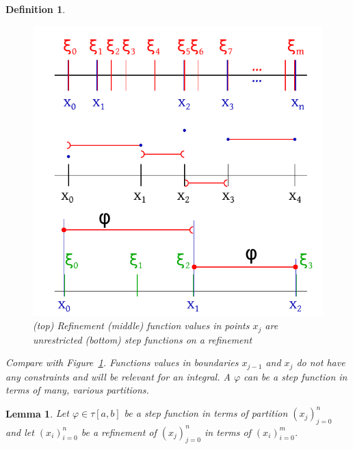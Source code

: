 \documentclass{article}
\newtheorem{definition}{Definition}  \numberwithin{definition}{section}
\newtheorem{lemma}{Lemma}  \numberwithin{lemma}{section}
\begin{document}
\begin{definition}
\begin{itemize}
      \begin{figure}[h]
        \begin{center}
          \includegraphics{img/10_refinement.pdf}
          \caption{(top) Refinement (middle) function values in points $x_j$ are unrestricted (bottom) step functions on a refinement}
          \label{img:refine}
        \end{center}
      \end{figure}

      Compare with Figure~\ref{img:refine}.
      Functions values in boundaries $x_{j-1}$ and $x_j$ do not have any constraints and will be relevant for an integral.
      A $\varphi$ can be a step function in terms of many, various partitions.
  \end{itemize}
\end{definition}

\begin{lemma}
  Let $\varphi \in \tau[a,b]$ be a step function in terms of partition $(x_j)_{j=0}^n$ and let $(x_i)_{i=0}^n$ be a refinement of $(x_j)_{j=0}^n$ in terms of $(x_i)_{i=0}^m$.
\end{lemma}
\end{document}
